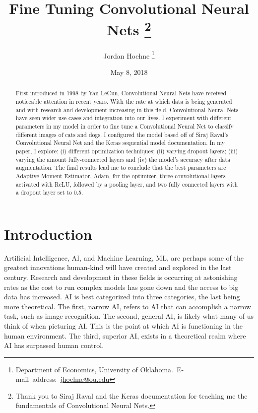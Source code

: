 \documentclass[12pt,english]{article}
\begin{document}
\begin{singlespace}
\title{Fine Tuning Convolutional Neural Nets
\thanks{Thank you to Siraj Raval and the Keras documentation for teaching me the fundamentals of Convolutional Neural Nets.}}
\end{singlespace}

\author{Jordan Hoehne
\thanks{Department of Economics, University of Oklahoma.\
E-mail~address:~\href{mailto:jhoehne@ou.edu}{jhoehne@ou.edu}}}

\date{May 8, 2018}

\maketitle
\begin{abstract}
\begin{singlespace}
First introduced in 1998 by Yan LeCun, Convolutional Neural Nets have received noticeable attention in recent years. With the rate at which data is being generated and with research and development increasing in this field, Convolutional Neural Nets have seen wider use cases and integration into our lives. I experiment with different parameters in my model in order to fine tune a Convolutional Neural Net to classify different images of cats and dogs. I configured the model based off of Siraj Raval's Convolutional Neural Net and the Keras sequential model documentation. In my paper, I explore: (i) different optimization techniques; (ii) varying dropout layers; (iii) varying the amount fully-connected layers and (iv) the model’s accuracy after data augmentation. The final results lead me to conclude that the best parameters are Adaptive Moment Estimator, Adam, for the optimizer, three convolutional layers activated with ReLU, followed by a pooling layer, and two fully connected layers with a dropout layer set to 0.5.
\end{singlespace}
\end{abstract}
\vfill{}

\pagebreak{}

\section{Introduction} 
Artificial Intelligence, AI, and Machine Learning, ML, are perhaps some of the greatest innovations human-kind will have created and explored in the last century. Research and development in these fields is occurring at astonishing rates as the cost to run complex models has gone down and the access to big data has increased. AI is best categorized into three categories, the last being more theoretical. The first, narrow AI, refers to AI that can accomplish a narrow task, such as image recognition. The second, general AI, is likely what many of us think of when picturing AI. This is the point at which AI is functioning in the human environment. The third, superior AI, exists in a theoretical realm where AI has surpassed human control. \par
\end{document}
